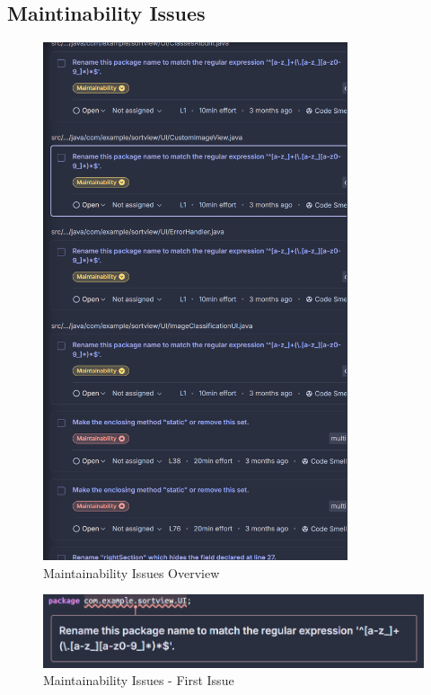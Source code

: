 \documentclass[12pt,a4paper]{article}
\begin{document}
\subsection{Maintinability Issues}
\begin{figure}[H]
    \centering
    \includegraphics[width=0.8\textwidth]{Maintainability Issues-40I.png}
    \caption{Maintainability Issues Overview}
    \label{fig:40I}
\end{figure}
\begin{figure}[H]
    \centering
    \includegraphics[width=1\textwidth]{Maintainability Issues-1st.png}
    \caption{Maintainability Issues - First Issue}
    \label{fig:MI-1st}
\end{figure}
\end{document}
